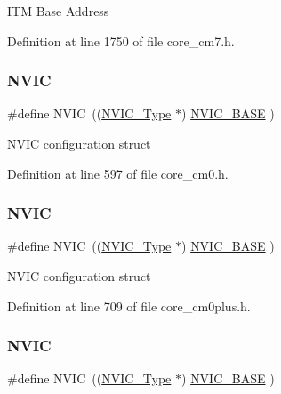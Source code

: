 I\+TM Base Address 

Definition at line 1750 of file core\+\_\+cm7.\+h.

\mbox{\label{group___c_m_s_i_s__core__base_gac8e97e8ce56ae9f57da1363a937f8a17}} 
\subsubsection{\texorpdfstring{N\+V\+IC}{NVIC}\hspace{0.1cm}{\footnotesize\ttfamily [1/7]}}
{\footnotesize\ttfamily \#define N\+V\+IC~((\hyperlink{struct_n_v_i_c___type}{N\+V\+I\+C\+\_\+\+Type}      $\ast$)     \hyperlink{group___c_m_s_i_s__core__base_gaa0288691785a5f868238e0468b39523d}{N\+V\+I\+C\+\_\+\+B\+A\+SE}     )}

N\+V\+IC configuration struct 

Definition at line 597 of file core\+\_\+cm0.\+h.

\mbox{\label{group___c_m_s_i_s__core__base_gac8e97e8ce56ae9f57da1363a937f8a17}} 
\subsubsection{\texorpdfstring{N\+V\+IC}{NVIC}\hspace{0.1cm}{\footnotesize\ttfamily [2/7]}}
{\footnotesize\ttfamily \#define N\+V\+IC~((\hyperlink{struct_n_v_i_c___type}{N\+V\+I\+C\+\_\+\+Type}      $\ast$)     \hyperlink{group___c_m_s_i_s__core__base_gaa0288691785a5f868238e0468b39523d}{N\+V\+I\+C\+\_\+\+B\+A\+SE}     )}

N\+V\+IC configuration struct 

Definition at line 709 of file core\+\_\+cm0plus.\+h.

\mbox{\label{group___c_m_s_i_s__core__base_gac8e97e8ce56ae9f57da1363a937f8a17}} 
\subsubsection{\texorpdfstring{N\+V\+IC}{NVIC}\hspace{0.1cm}{\footnotesize\ttfamily [3/7]}}
{\footnotesize\ttfamily \#define N\+V\+IC~((\hyperlink{struct_n_v_i_c___type}{N\+V\+I\+C\+\_\+\+Type}      $\ast$)     \hyperlink{group___c_m_s_i_s__core__base_gaa0288691785a5f868238e0468b39523d}{N\+V\+I\+C\+\_\+\+B\+A\+SE}     )}

